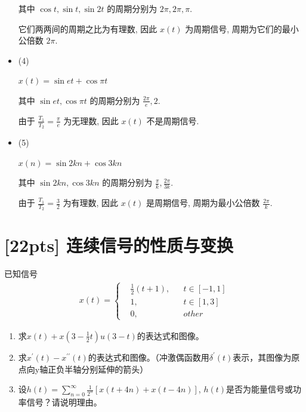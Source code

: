 \documentclass[a4paper,UTF8]{article}
\numberwithin{equation}{section}
\begin{document}
\begin{framed}
\begin{spacing}{1.5}
\begin{itemize}
      其中 $\cos t, \sin t, \sin 2t$ 的周期分别为 $2\pi, 2\pi, \pi$.
      
      它们两两间的周期之比为有理数, 因此 $x(t)$ 为周期信号, 周期为它们的最小公倍数 $\displaystyle 2\pi$.
      
      \item (4)
      
      $x(t) = \sin et + \cos \pi t$
      
      其中 $\sin et, \cos \pi t$ 的周期分别为 $\displaystyle \frac{2\pi}{e}, 2$.
      
      由于 $\displaystyle \frac{T_1}{T_2} = \frac{\pi}{e}$ 为无理数, 因此 $x(t)$ 不是周期信号.
      
      \item (5)
      
      $x(n) = \sin 2kn + \cos 3kn$
      
      其中 $\sin 2kn, \cos 3kn$ 的周期分别为 $\displaystyle \frac{\pi}{k}, \frac{2\pi}{3k}$.
      
      由于 $\displaystyle \frac{T_1}{T_2} = \frac{3}{2}$ 为有理数, 因此 $x(t)$ 是周期信号, 周期为最小公倍数 $\displaystyle \frac{2\pi}{k}$.
      
    \end{itemize}
\end{spacing}
\end{framed}


\newpage
\section{[22pts] 连续信号的性质与变换}
已知信号
\begin{equation*}
    \begin{aligned}
    x(t)=\left\{
    \begin{aligned}
    & \frac{1}{2}(t+1), && t\in[-1,1]\\
    & 1, && t\in[1,3]\\
    & 0, && other
    \end{aligned}
    \right.
    \end{aligned}
\end{equation*}
\begin{enumerate}[(1)]
	\item 求$x(t)+x(3-\displaystyle\frac{1}{2}t)u(3-t)$的表达式和图像。
	\item 求$x^{\prime}(t)-x^{\prime\prime}(t)$的表达式和图像。（冲激偶函数用$\delta^{\prime}(t)$表示，其图像为原点向y轴正负半轴分别延伸的箭头）
	\item 设$h(t)=\displaystyle\sum^{\infty}_{n=0}\frac{1}{2^n}\left[x(t+4n)+x(t-4n)\right]$, $h(t)$是否为能量信号或功率信号？请说明理由。
\end{enumerate}
	
\end{document}
